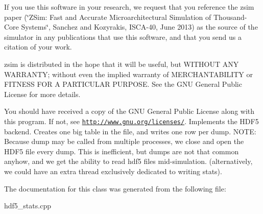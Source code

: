 If you use this software in your research, we request that you reference the zsim paper (\char`\"{}\-Z\-Sim\-: Fast and Accurate Microarchitectural Simulation of
\-Thousand-\/\-Core Systems\char`\"{}, Sanchez and Kozyrakis, I\-S\-C\-A-\/40, June 2013) as the source of the simulator in any publications that use this software, and that you send us a citation of your work.

zsim is distributed in the hope that it will be useful, but W\-I\-T\-H\-O\-U\-T A\-N\-Y W\-A\-R\-R\-A\-N\-T\-Y; without even the implied warranty of M\-E\-R\-C\-H\-A\-N\-T\-A\-B\-I\-L\-I\-T\-Y or F\-I\-T\-N\-E\-S\-S F\-O\-R A P\-A\-R\-T\-I\-C\-U\-L\-A\-R P\-U\-R\-P\-O\-S\-E. See the G\-N\-U General Public License for more details.

You should have received a copy of the G\-N\-U General Public License along with this program. If not, see \href{http://www.gnu.org/licenses/}{\tt http\-://www.\-gnu.\-org/licenses/}. Implements the H\-D\-F5 backend. Creates one big table in the file, and writes one row per dump. N\-O\-T\-E\-: Because dump may be called from multiple processes, we close and open the H\-D\-F5 file every dump. This is inefficient, but dumps are not that common anyhow, and we get the ability to read hdf5 files mid-\/simulation. (alternatively, we could have an extra thread exclusively dedicated to writing stats). 

The documentation for this class was generated from the following file\-:\begin{DoxyCompactItemize}
\item 
hdf5\-\_\-stats.\-cpp\end{DoxyCompactItemize}

